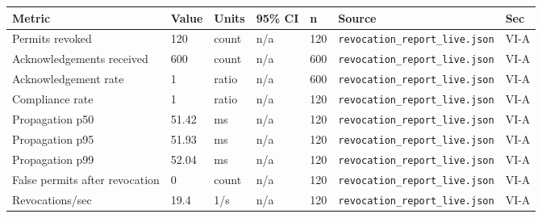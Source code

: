 \begin{tabular}{lllllll}
\hline
Metric & Value & Units & 95\% CI & n & Source & Sec \\
\hline
Permits revoked & 120 & count & n/a & 120 & \texttt{revocation_report_live.json} & VI-A \\
Acknowledgements received & 600 & count & n/a & 600 & \texttt{revocation_report_live.json} & VI-A \\
Acknowledgement rate & 1 & ratio & n/a & 600 & \texttt{revocation_report_live.json} & VI-A \\
Compliance rate & 1 & ratio & n/a & 120 & \texttt{revocation_report_live.json} & VI-A \\
Propagation p50 & 51.42 & ms & n/a & 120 & \texttt{revocation_report_live.json} & VI-A \\
Propagation p95 & 51.93 & ms & n/a & 120 & \texttt{revocation_report_live.json} & VI-A \\
Propagation p99 & 52.04 & ms & n/a & 120 & \texttt{revocation_report_live.json} & VI-A \\
False permits after revocation & 0 & count & n/a & 120 & \texttt{revocation_report_live.json} & VI-A \\
Revocations/sec & 19.4 & 1/s & n/a & 120 & \texttt{revocation_report_live.json} & VI-A \\
\hline
\end{tabular}
